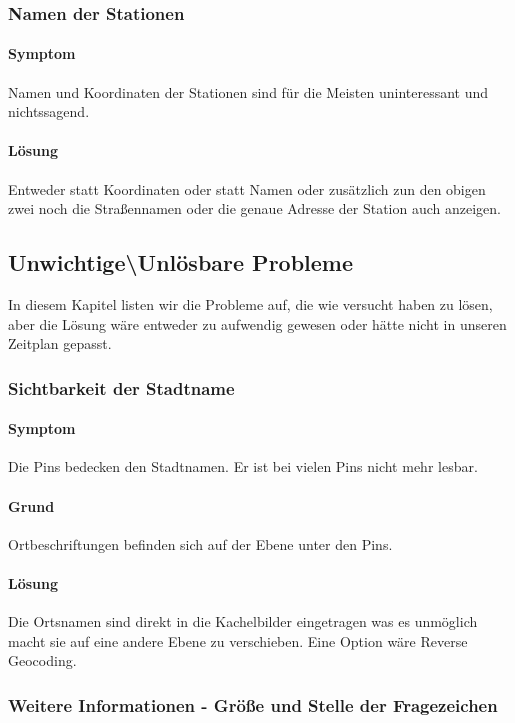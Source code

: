 \subsubsection{Namen der Stationen}
\paragraph{Symptom}

Namen und Koordinaten der Stationen sind für die Meisten uninteressant und nichtssagend.
 

\paragraph{Lösung}
Entweder statt Koordinaten oder statt Namen oder zusätzlich zun den obigen zwei noch die Straßennamen oder die genaue Adresse der Station auch anzeigen.


\subsection{Unwichtige\textbackslash Unlösbare Probleme}

In diesem Kapitel listen wir die Probleme auf, die wie versucht haben zu lösen, aber die Lösung wäre entweder zu aufwendig gewesen oder hätte nicht in unseren Zeitplan gepasst.


\subsubsection{Sichtbarkeit der Stadtname}
\paragraph{Symptom}
Die Pins bedecken den Stadtnamen. Er ist bei vielen Pins nicht mehr lesbar.

\paragraph{Grund}
Ortbeschriftungen befinden sich auf der Ebene unter den Pins. 

\paragraph{Lösung}
Die Ortsnamen sind direkt in die Kachelbilder eingetragen was es unmöglich macht sie 
auf eine andere Ebene zu verschieben. Eine Option wäre Reverse Geocoding.

\subsubsection{Weitere Informationen - Größe und Stelle der Fragezeichen}

